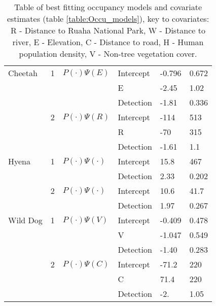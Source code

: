 \begin{table}[!h]
\begin{center}
\begin{tabular}{l l l l l l}
	Cheetah	& 1		&$P(\cdot)\Psi(E)$			& Intercept	&-0.796		&0.672\\	
			& 		&							&E			&-2.45		&1.02\\	
			& 		&							&Detection	&-1.81		&0.336	\\				
			& 2		&$P(\cdot)\Psi(R)$			& Intercept	&-114		&513\\	
			& 		&							&R			&-70			&315\\	
			& 		&							&Detection	&-1.61		&1.1	\\				
	Hyena	& 1		&$P(\cdot)\Psi(\cdot)$		& Intercept	&15.8		&467\\	
			& 		&							&Detection	&2.33		&0.202	\\		
			& 2		&$P(\cdot)\Psi(\cdot)$		& Intercept	&10.6		&41.7\\	
			& 		&							&Detection	&1.97		&0.267\\				
	Wild Dog& 1		&$P(\cdot)\Psi(V)$			& Intercept	&-0.409		&0.478\\	
			& 		&							& V			&-1.047		&0.549\\	
			& 		&							&Detection	&-1.40		&0.283\\				
			& 2		&$P(\cdot)\Psi(C)$			& Intercept	&-71.2		&220\\	
			& 		&							& C			&71.4		&220	\\	
			& 		&							&Detection	&-2.			&1.05	\\				
			\hline \hline						
		\end{tabular}
		\caption{Table of best fitting occupancy models and covariate estimates (table \ref{table:Occu_models}), key to covariates: R - Distance to Ruaha National Park, W - Distance to river, E - Elevation, C - Distance to road, H - Human population density, V - Non-tree vegetation cover.}
	\label{table:best_occu_models}
	\end{center}
\end{table}
